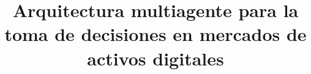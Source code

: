 \documentclass[12pt,a4paper]{report}
\title{Arquitectura multiagente para la toma de decisiones en mercados de activos digitales}
\author{}
\date{}
\begin{document}











\nocite{sutton2018reinforcement,schulman2017ppo,terry2021pettingzoo,ray2018rllib}
\cleardoublepage
{}



\appendix

\end{document}
